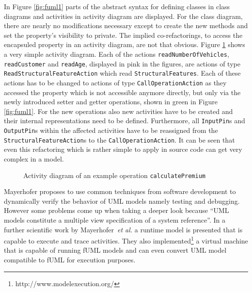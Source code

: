 \documentclass{llncs}
\begin{document}
In Figure \ref{fig:fuml1} parts of the abstract syntax for defining classes in class diagrams and activities in activity diagram are
displayed. For the class diagram, there are nearly no modifications necessary except to create the new methods and set the
property's visibility to private. The implied co-refactorings, to access the encapsuled property in an activity diagram, are not that 
obvious. Figure \ref{fig:calculatePremiumRef} shows a very
simple activity diagram. Each of the actions \texttt{read\-Number\-Of\-Vehicles}, \texttt{read\-Customer} and
\texttt{readAge}, displayed in pink in the figures, are actions of type \texttt{Read\-Structural\-Feature\-Action} which read \texttt{Structural\-Features}. 
Each of these actions has to be changed to actions of type \texttt{Call\-Operation\-Action} as they
accessed the property which is not accessible anymore directly, but only via the newly introduced setter and getter operations,
shown in green in Figure \ref{fig:fuml1}. For the new operations also new activities have to be created and their internal 
representations need to be defined. Furthermore, all \texttt{InputPin}s and \texttt{OutputPin}s within the affected 
activities have to be reassigned from the \texttt{Structural\-Feature\-Action}s to the \texttt{Call\-Operation\-Action}.
It can be seen that even this refactoring which is rather simple to apply in source code can get very complex in a model.

\begin{figure}[h!t]
 \centering
 \caption{Activity diagram of an example operation \texttt{calculatePremium}}
 \label{fig:calculatePremiumRef}
\end{figure}

Mayerhofer \cite{DBLP:conf/icse/Mayerhofer12} proposes to use common techniques from software development to
dynamically verify the behavior of UML models namely testing and debugging. However some problems come up when
taking a deeper look because ``UML models constitute a multiple view specification of a system reference''. In a further
scientific work by Mayerhofer~\textit{et al.} \cite{DBLP:conf/models/MayerhoferLK12} a runtime model is presented that is capable
to execute and trace activities. They also implemented\footnote{http://www.modelexecution.org/} a virtual machine that
is capable of running fUML models and can even convert UML model compatible to fUML for
execution purposes.
\end{document}
